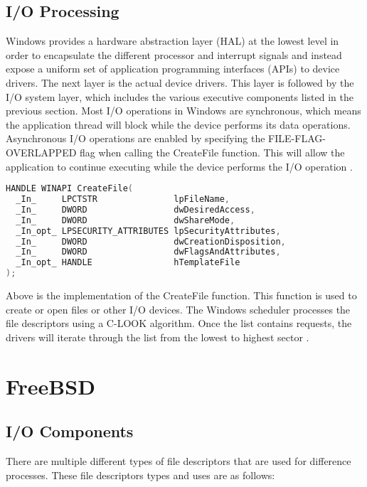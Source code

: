 \documentclass[letterpaper,draftclsnofoot,10pt,onecolumn,titlepage]{IEEEtran}\usepackage[margin=0.75in]{geometry}
\begin{document}
\subsection{I/O Processing}
Windows provides a hardware abstraction layer (HAL) at the lowest level in order to encapsulate the different
processor and interrupt signals and instead expose a uniform set of application programming interfaces (APIs)
to device drivers. The next layer is the actual device drivers. This layer is followed by the I/O system
layer, which includes the various executive components listed in the previous section. Most I/O
operations in Windows are synchronous, which means the application thread will block while the device
performs its data operations. Asynchronous I/O operations are enabled by specifying the FILE-FLAG-OVERLAPPED
flag when calling the CreateFile function. This will allow the application to continue executing while the
device performs the I/O operation \cite{Windows}.

\begin{lstlisting}[language=C++]
HANDLE WINAPI CreateFile(
  _In_     LPCTSTR               lpFileName,
  _In_     DWORD                 dwDesiredAccess,
  _In_     DWORD                 dwShareMode,
  _In_opt_ LPSECURITY_ATTRIBUTES lpSecurityAttributes,
  _In_     DWORD                 dwCreationDisposition,
  _In_     DWORD                 dwFlagsAndAttributes,
  _In_opt_ HANDLE                hTemplateFile
); 
\end{lstlisting}

Above is the implementation of the CreateFile function. This function is used to create or open files or
other I/O devices. The Windows scheduler processes the file descriptors using a C-LOOK algorithm. Once
the list contains requests, the drivers will iterate through the list from the lowest to highest sector
\cite{Windows_CreateFile}.

\section{FreeBSD}

\subsection{I/O Components}
There are multiple different types of file descriptors that are used for difference processes. These 
file descriptors types and uses are as follows:
\end{document}
